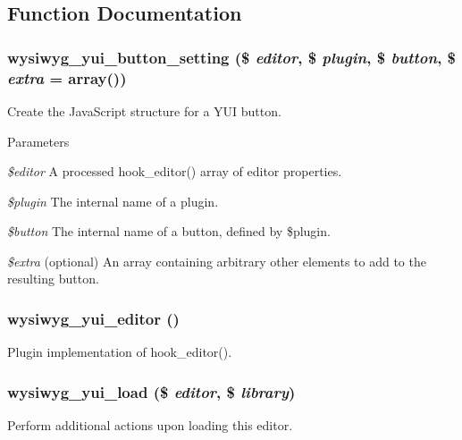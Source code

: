 \subsection{Function Documentation}
\hypertarget{yui_8inc_ace13fd2caec519fdb5baa809d7688241}{
\subsubsection[{wysiwyg\_\-yui\_\-button\_\-setting}]{\setlength{\rightskip}{0pt plus 5cm}wysiwyg\_\-yui\_\-button\_\-setting (\$ {\em editor}, \/  \$ {\em plugin}, \/  \$ {\em button}, \/  \$ {\em extra} = {\ttfamily array()})}}
\label{yui_8inc_ace13fd2caec519fdb5baa809d7688241}
Create the JavaScript structure for a YUI button.


\begin{DoxyParams}{Parameters}
\item[{\em \$editor}]A processed hook\_\-editor() array of editor properties. \item[{\em \$plugin}]The internal name of a plugin. \item[{\em \$button}]The internal name of a button, defined by \$plugin. \item[{\em \$extra}](optional) An array containing arbitrary other elements to add to the resulting button. \end{DoxyParams}
\hypertarget{yui_8inc_a8305c21ebccac73e659a81258f0a033f}{
\subsubsection[{wysiwyg\_\-yui\_\-editor}]{\setlength{\rightskip}{0pt plus 5cm}wysiwyg\_\-yui\_\-editor ()}}
\label{yui_8inc_a8305c21ebccac73e659a81258f0a033f}
Plugin implementation of hook\_\-editor(). \hypertarget{yui_8inc_aee9d025b17f5954b492eca89d50aa5cc}{
\subsubsection[{wysiwyg\_\-yui\_\-load}]{\setlength{\rightskip}{0pt plus 5cm}wysiwyg\_\-yui\_\-load (\$ {\em editor}, \/  \$ {\em library})}}
\label{yui_8inc_aee9d025b17f5954b492eca89d50aa5cc}
Perform additional actions upon loading this editor.



